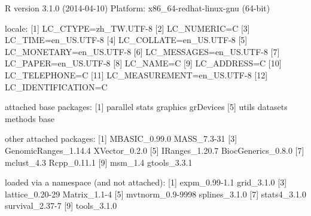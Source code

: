 \documentclass[a4paper,10pt]{article}
\begin{document}
\begin{Schunk}
\begin{Soutput}
R version 3.1.0 (2014-04-10)
Platform: x86_64-redhat-linux-gnu (64-bit)

locale:
 [1] LC_CTYPE=zh_TW.UTF-8      
 [2] LC_NUMERIC=C              
 [3] LC_TIME=en_US.UTF-8       
 [4] LC_COLLATE=en_US.UTF-8    
 [5] LC_MONETARY=en_US.UTF-8   
 [6] LC_MESSAGES=en_US.UTF-8   
 [7] LC_PAPER=en_US.UTF-8      
 [8] LC_NAME=C                 
 [9] LC_ADDRESS=C              
[10] LC_TELEPHONE=C            
[11] LC_MEASUREMENT=en_US.UTF-8
[12] LC_IDENTIFICATION=C       

attached base packages:
[1] parallel  stats     graphics  grDevices
[5] utils     datasets  methods   base     

other attached packages:
 [1] MBASIC_0.99.0        MASS_7.3-31         
 [3] GenomicRanges_1.14.4 XVector_0.2.0       
 [5] IRanges_1.20.7       BiocGenerics_0.8.0  
 [7] mclust_4.3           Rcpp_0.11.1         
 [9] msm_1.4              gtools_3.3.1        

loaded via a namespace (and not attached):
[1] expm_0.99-1.1    grid_3.1.0      
[3] lattice_0.20-29  Matrix_1.1-4    
[5] mvtnorm_0.9-9998 splines_3.1.0   
[7] stats4_3.1.0     survival_2.37-7 
[9] tools_3.1.0     
\end{Soutput}
\end{Schunk}



%


\end{document}
